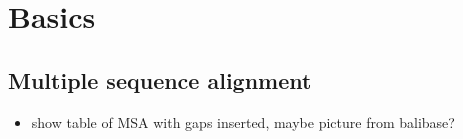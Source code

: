 \chapter{Basics}

\section{Multiple sequence alignment}

\begin{itemize}
	\item show table of MSA with gaps inserted, maybe picture from balibase?
\end{itemize}

